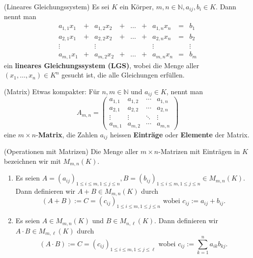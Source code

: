 \documentclass[../Algebra_script.tex]{subfiles}
\begin{document}
\begin{definition}{(Lineares Gleichungssystem)}
	Es sei $K$ ein Körper, $m, n \in \mathbb{N}, a_{ij}, b_i \in K$. Dann nennt man
	\[\begin{matrix}
		a_{1,1}x_1 &+ &a_{1,2}x_2 &+ &\ldots &+ &a_{1,n}x_n &= &b_1 \\
		a_{2,1}x_1 &+ &a_{2,2}x_2 &+ &\ldots &+ &a_{2,n}x_n &= &b_2\\
		 \vdots    &  &\vdots     &  &       & &\vdots     & &\vdots\\
		a_{m,1}x_1 &+ &a_{m,2}x_2 &+ &\ldots &+ &a_{m,n}x_n &= &b_m 
	\end{matrix}\]	
	ein \textbf{lineares Gleichungssystem (LGS)}, wobei die Menge aller $(x_1, \ldots, x_n) \in K^n$ gesucht ist, die alle Gleichungen erfüllen.	
\end{definition}

\begin{definition}{(Matrix)}
	Etwas kompakter: Für $n, m \in \mathbb{N}$ und $a_{ij} \in K$, nennt man
	\[A_{m,n} = 
		\begin{pmatrix}
			a_{1,1} & a_{1,2} & \cdots & a_{1,n} \\
			a_{2,1} & a_{2,2} & \cdots & a_{2,n} \\
			\vdots  & \vdots  & \ddots & \vdots  \\
			a_{m,1} & a_{m,2} & \cdots & a_{m,n} 
 		\end{pmatrix}
 	\]
 	eine $m \times n$-\textbf{Matrix}, die Zahlen $a_{ij}$ heissen \textbf{Einträge} oder \textbf{Elemente} der Matrix.
\end{definition}

\begin{definition}{(Operationen mit Matrizen)}
	Die Menge aller $m \times n$-Matrizen mit Einträgen in $K$ bezeichnen wir mit $M_{m,n}(K)$.
	\begin{enumerate}
		\item Es seien $A = (a_{ij})_{1 \leq i \leq m, 1 \leq j \leq n}, B = (b_{ij})_{1 \leq i \leq m, 1 \leq j \leq n} \in M_{m, n}(K)$. Dann definieren wir $A + B \in M_{m, n}(K)$ durch
		\[(A + B) := C = (c_{ij})_{1 \leq i \leq m, 1 \leq j \leq n} \text{ wobei } c_{ij} := a_{ij} + b_{ij} .\]
		\item Es seien $A \in M_{m, n}(K)$ und $B \in M_{n, \ell}(K)$. Dann definieren wir $A \cdot B \in M_{m, \ell}(K)$ durch
		\[(A \cdot B) := C = (c_{ij})_{1 \leq i \leq m, 1 \leq j \leq \ell} \text{ wobei } c_{ij} := \sum_{k=1}^{n} a_{ik}b_{kj} .\]  
	\end{enumerate}
\end{definition}
\end{document}
